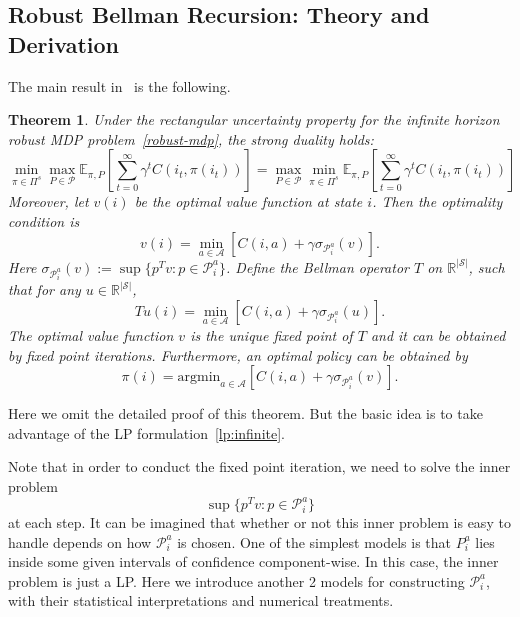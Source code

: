 \documentclass[11pt,reqno]{amsart}
\newtheorem{theorem}{Theorem}[section]
\theoremstyle{definition}
\numberwithin{equation}{section}
\theoremstyle{remark}
\begin{document}

\subsection{Robust Bellman Recursion: Theory and Derivation}
The main result in~\cite{nilim2005robust} is the following.
\begin{theorem}
Under the rectangular uncertainty property for the infinite horizon robust MDP problem~\ref{robust-mdp}, the strong duality holds:
\begin{equation}\label{robust-mdp-strong-duality}
    \min_{\pi\in\Pi^s} \max_{P\in\mathcal{P}} \mathbb{E}_{\pi, P} \left[\sum_{t=0}^{\infty}\gamma^t C(i_t, \pi(i_t))\right]=\max_{P\in\mathcal{P}}\min_{\pi\in\Pi^s}\mathbb{E}_{\pi, P} \left[\sum_{t=0}^{\infty}\gamma^t C(i_t, \pi(i_t))\right]
\end{equation}
Moreover, let $v(i)$ be the optimal value function at state $i$. Then the optimality condition is 
\begin{equation}\label{robust-bellman-optimal-condition}
    v(i)=\min_{a\in\mathcal{A}}\left[C(i,a)+\gamma\sigma_{\mathcal{P}^a_i}(v)\right].
\end{equation}
Here $\sigma_{\mathcal{P}^a_i}(v):=\sup\{p^Tv:p\in\mathcal{P}^a_i\}$. Define the Bellman operator $T$ on $\mathbb{R}^{|\mathcal{S}|}$, such that for any $u\in\mathbb{R}^{|\mathcal{S}|}$,
\begin{equation}
    Tu(i)=\min_{a\in\mathcal{A}}\left[C(i,a)+\gamma\sigma_{\mathcal{P}^a_i}(u)\right].
\end{equation}
 The optimal value function $v$ is the unique fixed point of $T$ and it can be obtained by fixed point iterations. Furthermore, an optimal policy can be obtained by
 \begin{equation}
    \pi(i)=\mathrm{argmin}_{a\in\mathcal{A}}\left[C(i,a)+\gamma\sigma_{\mathcal{P}^a_i}(v)\right].
\end{equation}
\end{theorem}
Here we omit the detailed proof of this theorem. But the basic idea is to take advantage of the LP formulation~\ref{lp:infinite}.

\medskip

Note that in order to conduct the fixed point iteration, we need to solve the inner problem \begin{equation}\label{inner}
    \sup\{p^Tv:p\in\mathcal{P}^a_i\}
\end{equation}
at each step. It can be imagined that whether or not this inner problem is easy to handle depends on how $\mathcal{P}^a_i$ is chosen. One of the simplest models is that $P^a_i$ lies inside some given intervals of confidence component-wise. In this case, the inner problem is just a LP. Here we introduce another 2 models for constructing $\mathcal{P}^a_i$, with their statistical interpretations and numerical treatments.
\end{document}
